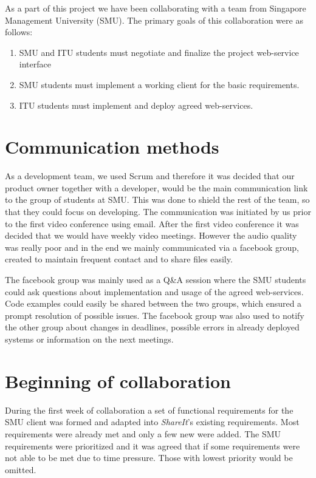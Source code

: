 \documentclass[../report.tex]{subfiles}
\begin{document}
\graphicspath{{img/}{../img/}}

As a part of this project we have been collaborating with a team from Singapore Management University (SMU). The primary goals\cite{SMU-Wiki-1} of this collaboration were as follows:

\begin{enumerate}[label=\bfseries G\arabic*:]
\item SMU and ITU students must negotiate and finalize the project web-service interface
\item SMU students must implement a working client for the basic requirements.
\item ITU students must implement and deploy agreed web-services.
\end{enumerate}

\section{Communication methods}
As a development team, we used Scrum and therefore it was decided that our product owner together with a developer, would be the main communication link to the group of students at SMU.
This was done to shield the rest of the team, so that they could focus on developing.
The communication was initiated by us prior to the first video conference using email.
After the first video conference it was decided that we would have weekly video meetings.
However the audio quality was really poor and in the end we mainly communicated via a facebook group, created to maintain frequent contact and to share files easily.

The facebook group was mainly used as a Q\&A session where the SMU students could ask questions about implementation and usage of the agreed web-services. Code examples could easily be shared between the two groups, which ensured a prompt resolution of possible issues. The facebook group was also used to notify the other group about changes in deadlines, possible errors in already deployed systems or information on the next meetings.


\section{Beginning of collaboration}
During the first week of collaboration a set of functional requirements for the SMU client was formed and adapted into \textit{ShareIt}'s existing requirements. 
Most requirements were already met and only a few new were added. 
The SMU requirements were prioritized and it was agreed that if some requirements were not able to be met due to time pressure. Those with lowest priority would be omitted.
\end{document}
